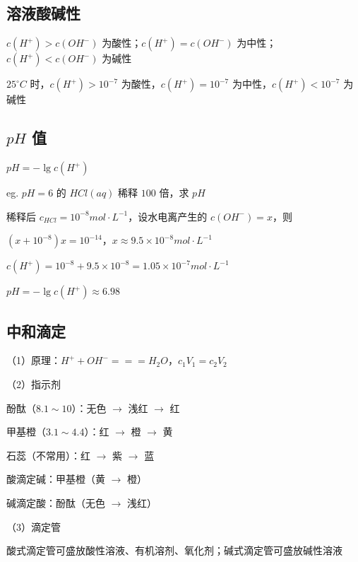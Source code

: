 \documentclass[UTF8,zihao=-4,openany]{ctexbook}
\begin{document}
\subsection{溶液酸碱性}
$c(H^+)>c(OH^-)$ 为酸性；$c(H^+)=c(OH^-)$ 为中性；$c(H^+)<c(OH^-)$ 为碱性\par

$25^{\circ}C$ 时，$c(H^+)>10^{-7}$ 为酸性，$c(H^+)=10^{-7}$ 为中性，$c(H^+)<10^{-7}$ 为碱性\par
\subsection{$pH$ 值}
$pH=-\lg c(H^+)$\par

eg. $pH=6$ 的 $HCl(aq)$ 稀释 $100$ 倍，求 $pH$\par

稀释后 $c_{HCl}=10^{-8}mol\cdot L^{-1}$，设水电离产生的 $c(OH^-)=x$，则\par

$(x+10^{-8})x=10^{-14}$，$x\approx9.5\times10^{-8}mol\cdot L^{-1}$\par

$c(H^+)=10^{-8}+9.5\times10^{-8}=1.05\times10^{-7}mol\cdot L^{-1}$\par

$pH=-\lg c(H^+)\approx6.98$\par
\subsection{中和滴定}
（1）原理：$H^++OH^-=\!=\!=H_2O$，$c_1V_1=c_2V_2$\par

（2）指示剂\par

酚酞（$8.1\sim10$）：无色 $\to$ 浅红 $\to$ 红\par

甲基橙（$3.1\sim4.4$）：红 $\to$ 橙 $\to$ 黄\par

石蕊（不常用）：红 $\to$ 紫 $\to$ 蓝\par

酸滴定碱：甲基橙（黄 $\to$ 橙）\par

碱滴定酸：酚酞（无色 $\to$ 浅红）\par

（3）滴定管\par

酸式滴定管可盛放酸性溶液、有机溶剂、氧化剂；碱式滴定管可盛放碱性溶液\par
\end{document}
